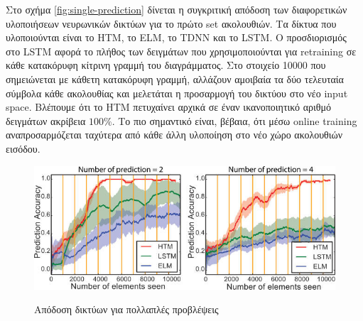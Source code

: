 Στο σχήμα \eqref{fig:single-prediction} δίνεται η συγκριτική απόδοση των διαφορετικών υλοποιήσεων νευρωνικών δικτύων για το πρώτο set ακολουθιών.
Τα δίκτυα που υλοποιούνται είναι το HTM, το ELM, το TDNN και το LSTM.
Ο προσδιορισμός στο LSTM αφορά το πλήθος των δειγμάτων που χρησιμοποιούνται για retraining σε κάθε κατακόρυφη κίτρινη γραμμή του διαγράμματος.
Στο στοιχείο 10000 που σημειώνεται με κάθετη κατακόρυφη γραμμή, αλλάζουν αμοιβαία τα δύο τελευταία σύμβολα κάθε ακολουθίας και μελετάται η προσαρμογή του δικτύου στο νέο input space.
Βλέπουμε ότι το HTM πετυχαίνει αρχικά σε έναν ικανοποιητικό αριθμό δειγμάτων ακρίβεια $100\%$.
Το πιο σημαντικό είναι, βέβαια, ότι μέσω online training αναπροσαρμόζεται ταχύτερα από κάθε άλλη υλοποίηση στο νέο χώρο ακολουθιών εισόδου.\\
\begin{figure}[H]
	\centering%
	{\includegraphics[width=0.8\columnwidth,clip=true]{figures/vlsi/multiple_predictions.jpg}}
	\caption{Απόδοση δικτύων για πολλαπλές προβλέψεις} \label{fig:multiple-prediction}
\end{figure}

